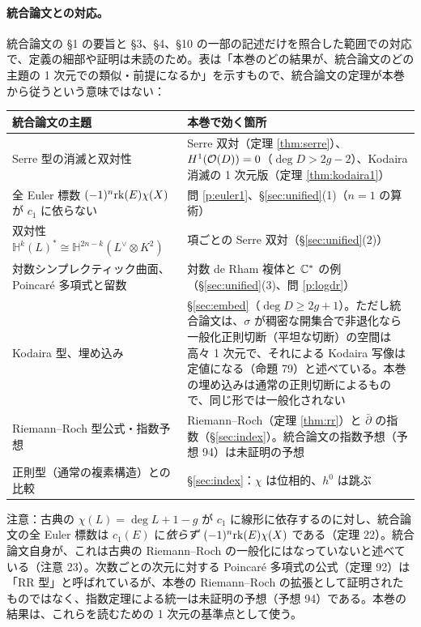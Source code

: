 \paragraph{統合論文との対応。}統合論文の §1 の要旨と §3、§4、§10 の一部の記述だけを照合した範囲での対応で、定義の細部や証明は未読のため\tQ。表は「本巻のどの結果が、統合論文のどの主題の 1 次元での類似・前提になるか」を示すもので、統合論文の定理が本巻から従うという意味ではない：
\begin{center}
\begin{tabular}{p{}p{}}
\toprule
統合論文の主題 & 本巻で効く箇所\\
\midrule
Serre 型の消滅と双対性 & Serre 双対（定理 \ref{thm:serre}）、$H^1(\mathcal O(D))=0$（$\deg D>2g-2$）、Kodaira 消滅の 1 次元版（定理 \ref{thm:kodaira1}）\\
全 Euler 標数 $(-1)^n\mathrm{rk}(E)\chi(X)$ が $c_1$ に依らない & 問 \ref{p:euler1}、\S\ref{sec:unified}(1)（$n=1$ の算術）\\
双対性 $\mathbb H^k(L)^*\cong\mathbb H^{2n-k}(L^\vee\otimes K^2)$ & 項ごとの Serre 双対（\S\ref{sec:unified}(2)）\\
対数シンプレクティック曲面、Poincaré 多項式と留数 & 対数 de Rham 複体と $\mathbb C^*$ の例（\S\ref{sec:unified}(3)、問 \ref{p:logdr}）\\
Kodaira 型、埋め込み & \S\ref{sec:embed}（$\deg D\ge2g+1$）。ただし統合論文は、$\sigma$ が稠密な開集合で非退化なら一般化正則切断（平坦な切断）の空間は高々 1 次元で、それによる Kodaira 写像は定値になる（命題 79）と述べている。本巻の埋め込みは通常の正則切断によるもので、同じ形では一般化されない\\
Riemann--Roch 型公式・指数予想 & Riemann--Roch（定理 \ref{thm:rr}）と $\bar\partial$ の指数（\S\ref{sec:index}）。統合論文の指数予想（予想 94）は未証明の予想\\
正則型（通常の複素構造）との比較 & \S\ref{sec:index}：$\chi$ は位相的、$h^0$ は跳ぶ\\
\bottomrule
\end{tabular}
\end{center}
注意：古典の $\chi(L)=\deg L+1-g$ が $c_1$ に線形に依存するのに対し、統合論文の全 Euler 標数は $c_1(E)$ に\emph{依らず} $(-1)^n\mathrm{rk}(E)\chi(X)$ である（定理 22）。統合論文自身が、これは古典の Riemann--Roch の一般化にはなっていないと述べている（注意 23）。次数ごとの次元に対する Poincaré 多項式の公式（定理 92）は「RR 型」と呼ばれているが、本巻の Riemann--Roch の拡張として証明されたものではなく、指数定理による統一は未証明の予想（予想 94）である。本巻の結果は、これらを読むための 1 次元の基準点として使う。

